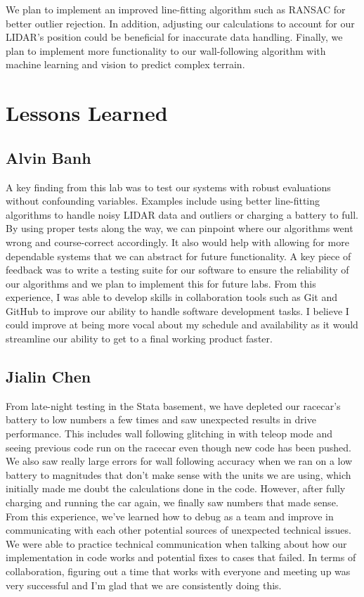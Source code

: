 \documentclass{article}
\begin{document}
We plan to implement an improved line-fitting algorithm such as RANSAC for better outlier rejection. In addition, adjusting our calculations to account for our LIDAR's position could be beneficial for inaccurate data handling. Finally, we plan to implement more functionality to our wall-following algorithm with machine learning and vision to predict complex terrain.

\section{Lessons Learned}

\subsection*{Alvin Banh}
A key finding from this lab was to test our systems with robust evaluations without confounding variables. Examples include using better line-fitting algorithms to handle noisy LIDAR data and outliers or charging a battery to full. By using proper tests along the way, we can pinpoint where our algorithms went wrong and course-correct accordingly. It also would help with allowing for more dependable systems that we can abstract for future functionality. A key piece of feedback was to write a testing suite for our software to ensure the reliability of our algorithms and we plan to implement this for future labs. From this experience, I was able to develop skills in collaboration tools such as Git and GitHub to improve our ability to handle software development tasks. I believe I could improve at being more vocal about my schedule and availability as it would streamline our ability to get to a final working product faster.

\subsection*{Jialin Chen}
From late-night testing in the Stata basement, we have depleted our racecar's battery to low numbers a few times and saw unexpected results in drive performance. This includes wall following glitching in with teleop mode and seeing previous code run on the racecar even though new code has been pushed. We also saw really large errors for wall following accuracy when we ran on a low battery to magnitudes that don't make sense with the units we are using, which initially made me doubt the calculations done in the code. However, after fully charging and running the car again, we finally saw numbers that made sense. From this experience, we've learned how to debug as a team and improve in communicating  with each other potential sources of unexpected technical issues. We were able to practice technical communication when talking about how our implementation in code works and potential fixes to cases that failed. In terms of collaboration, figuring out a time that works with everyone and meeting up was very successful and I'm glad that we are consistently doing this.
\end{document}
